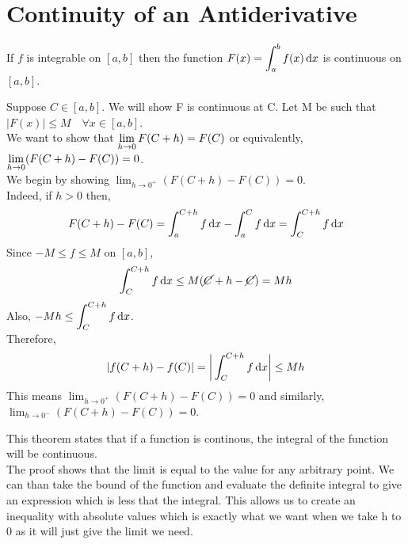 \documentclass[12pt]{article}
\begin{document}
\section{Continuity of an Antiderivative}
\begin{theo}{}
If \(f\) is integrable on \([a, b]\) then the function \(F(x) = \displaystyle\int_a^b f(x) \,\mathrm{d} x\) is continuous on \([a, b]\).   
\end{theo}
\newpage
\begin{prf}{}
Suppose \(C \in [a, b]\). We will show F is continuous at C. Let M be such that \(|F(x)| \le M \quad \forall x \in [a, b]\).\\
We want to show that \(\displaystyle\lim_{h\to 0} F(C+h) = F(C)\) or equivalently, \(\displaystyle\lim_{h\to 0} (F(C+h) - F(C)) = 0\).\\
We begin by showing \(\lim_{h\to 0^+}(F(C+h) - F(C)) = 0\).\\
Indeed, if \(h > 0\) then, \[F(C+h) - F(C) = \displaystyle\int_a^{C+h} f\,\mathrm{d} x - \displaystyle\int_a^C f \,\mathrm{d} x = \displaystyle\int_C^{C+h} f \,\mathrm{d} x\]
Since \(-M \le f \le M\) on \([a, b]\),
\[\displaystyle\int_C^{C+h} f\,\mathrm{d} x \le M(\cancel{C}+ h - \cancel{C}) = Mh\]
Also, \(-Mh \le \displaystyle\int_C^{C+h}f\,\mathrm{d} x\).\\
Therefore, \[|f(C+h)-f(C)| = \bigg\vert\displaystyle\int_C^{C+h} f\,\mathrm{d} x\bigg\vert \le Mh\]
This means \(\lim_{h\to 0^+}(F(C+h) - F(C)) = 0\) and similarly, \(\lim_{h\to 0^-}(F(C+h) - F(C)) = 0\).\\
\end{prf}
\begin{explanation}{}
    This theorem states that if a function is continous, the integral of the function will be continuous.\\
The proof shows that the limit is equal to the value for any arbitrary point. We can than take the bound of the function and evaluate the definite integral to give an expression which is less that the integral. This allows us to create an inequality with absolute values which is exactly what we want when we take h to 0 as it will just give the limit we need.\\
\end{explanation}
\end{document}
